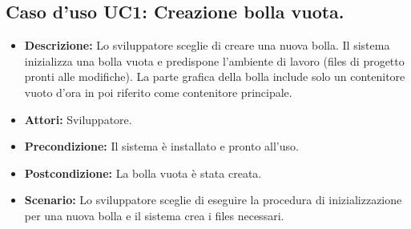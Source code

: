 \subsection{Caso d'uso UC1: Creazione bolla vuota.}
\begin{itemize}
\item[]\textbf{Descrizione:} Lo sviluppatore sceglie di creare una nuova bolla. Il sistema inizializza una bolla vuota e predispone l'ambiente di lavoro (files di progetto pronti alle modifiche). La parte grafica della bolla include solo un contenitore vuoto d'ora in poi riferito come contenitore principale.
\item[]\textbf{Attori:} Sviluppatore. 
\item[]\textbf{Precondizione:} Il sistema è installato e pronto all'uso. 
\item[]\textbf{Postcondizione:} La bolla vuota è stata creata. 
\item[]\textbf{Scenario:}
Lo sviluppatore sceglie di eseguire la procedura di inizializzazione per una nuova bolla e il sistema crea i files necessari. 
\end{itemize}

\clearpage

